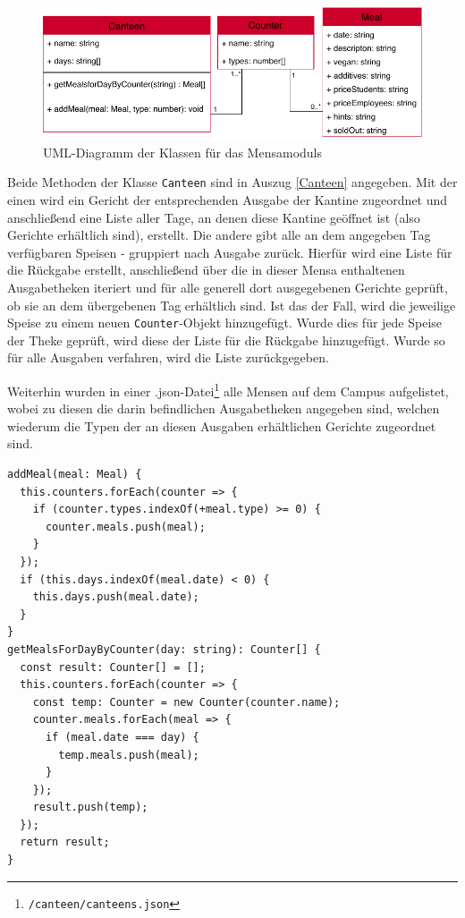 \begin{figure}[h]
\includegraphics{gfx/MensaUML}
\caption{UML-Diagramm der Klassen für das Mensamoduls}
\label{fig:cannteensUML}
\end{figure}
Beide  Methoden der Klasse \texttt{Canteen} sind in Auszug \ref{Canteen} angegeben. Mit der einen wird ein Gericht der entsprechenden Ausgabe der Kantine zugeordnet und anschließend eine Liste aller Tage, an denen diese Kantine geöffnet ist (also Gerichte erhältlich sind), erstellt. Die andere gibt alle an dem angegeben Tag verfügbaren Speisen - gruppiert nach Ausgabe zurück. Hierfür wird eine Liste für die Rückgabe erstellt, anschließend über die in dieser Mensa enthaltenen Ausgabetheken iteriert und für alle generell dort ausgegebenen Gerichte geprüft, ob sie an dem übergebenen Tag erhältlich sind. Ist das der Fall, wird die jeweilige Speise zu einem neuen \texttt{Counter}-Objekt hinzugefügt. Wurde dies für jede Speise der Theke geprüft, wird diese der Liste für die Rückgabe hinzugefügt. Wurde so für alle Ausgaben verfahren, wird die Liste zurückgegeben.

Weiterhin wurden in einer .json-Datei\footnote{\texttt{/canteen/canteens.json}} alle Mensen auf dem Campus aufgelistet, wobei zu diesen die darin befindlichen Ausgabetheken angegeben sind, welchen wiederum die Typen der an diesen Ausgaben erhältlichen Gerichte zugeordnet sind.

\begin{lstlisting}[float, floatplacement=h, style=htmlcssjs, caption={Auszug aus der Klasse \texttt{Canteen}}, label={Canteen}]
addMeal(meal: Meal) {
  this.counters.forEach(counter => {
    if (counter.types.indexOf(+meal.type) >= 0) {
      counter.meals.push(meal);
    }
  });
  if (this.days.indexOf(meal.date) < 0) {
    this.days.push(meal.date);
  }
}  
getMealsForDayByCounter(day: string): Counter[] {
  const result: Counter[] = [];
  this.counters.forEach(counter => {
    const temp: Counter = new Counter(counter.name);
    counter.meals.forEach(meal => {
      if (meal.date === day) {
        temp.meals.push(meal);
      }
    });
    result.push(temp);
  });
  return result;
}  
\end{lstlisting}

